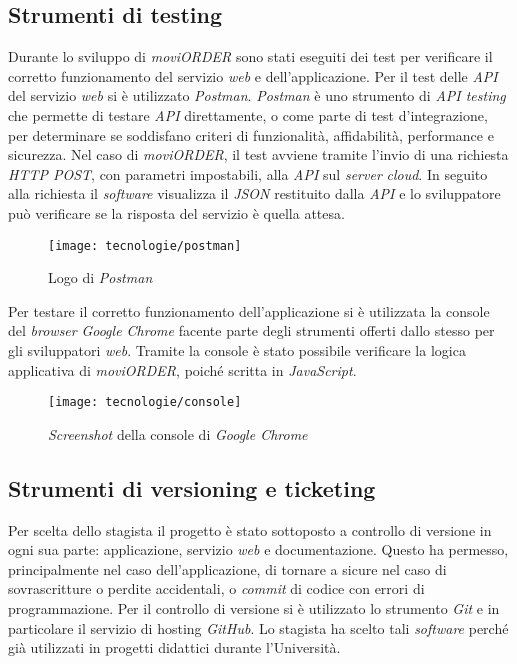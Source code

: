 \subsection{Strumenti di testing}

Durante lo sviluppo di \textit{moviORDER} sono stati eseguiti dei test per verificare il corretto funzionamento del servizio \textit{web} e dell'applicazione. Per il test delle \textit{API} del servizio \textit{web} si è utilizzato \textit{Postman}. \textit{Postman} è uno strumento di \textit{API testing} che permette di testare \textit{API} direttamente, o come parte di test d'integrazione, per determinare se soddisfano criteri di funzionalità, affidabilità, performance e sicurezza. Nel caso di \textit{moviORDER}, il test avviene tramite l'invio di una richiesta \textit{HTTP POST}, con parametri impostabili, alla \textit{API} sul \textit{server} \textit{cloud}. In seguito alla richiesta il \textit{software} visualizza il \textit{JSON} restituito dalla \textit{API} e lo sviluppatore può verificare se la risposta del servizio è quella attesa.

\begin{figure}[!h] 
    \centering 
    \texttt{[image: tecnologie/postman]} 
    \caption{Logo di \textit{Postman}}
\end{figure}

Per testare il corretto funzionamento dell'applicazione si è utilizzata la console del \textit{browser} \textit{Google Chrome} facente parte degli strumenti offerti dallo stesso per gli sviluppatori \textit{web}. Tramite la console è stato possibile verificare la logica applicativa di \textit{moviORDER}, poiché scritta in \textit{JavaScript}.

\begin{figure}[!h] 
    \centering 
    \texttt{[image: tecnologie/console]} 
    \caption{\textit{Screenshot} della console di \textit{Google Chrome}}
\end{figure}

\newpage

\subsection{Strumenti di versioning e ticketing}

Per scelta dello stagista il progetto è stato sottoposto a controllo di versione in ogni sua parte: applicazione, servizio \textit{web} e documentazione. Questo ha permesso, principalmente nel caso dell'applicazione, di tornare a  sicure nel caso di sovrascritture o perdite accidentali, o \textit{commit} di codice con errori di programmazione. Per il controllo di versione si è utilizzato lo strumento \textit{Git} e in particolare il servizio di hosting \textit{GitHub}. Lo stagista ha scelto tali \textit{software} perché già utilizzati in progetti didattici durante l'Università.

